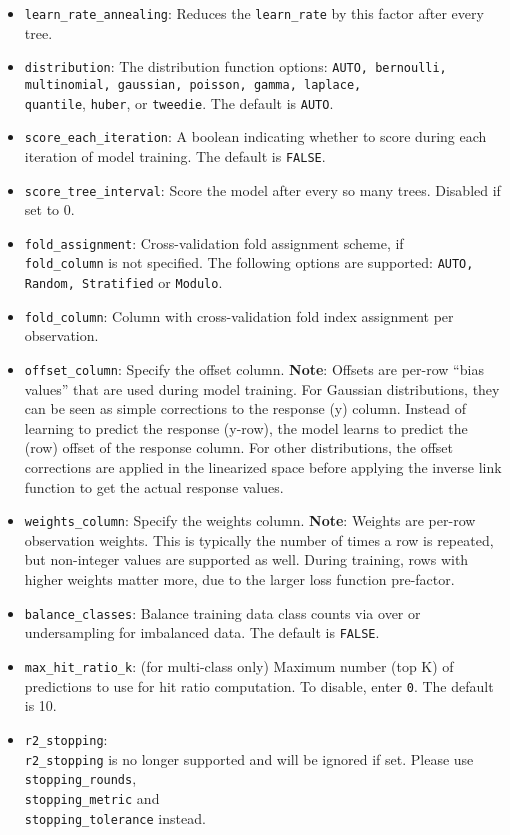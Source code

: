 \begin{itemize}
\item {\texttt{learn\_rate\_annealing}}: Reduces the {\texttt{learn\_rate}} by this factor after every tree. 
\item {\texttt{distribution}}: The distribution function options: \texttt{AUTO, bernoulli, multinomial, gaussian, poisson, gamma, laplace,} \\\texttt{quantile}, \texttt{huber}, or {\texttt{tweedie}}. The default is {\texttt{AUTO}}.
\item {\texttt{score\_each\_iteration}}: A boolean indicating whether to score during each iteration of model training.  The default is  {\texttt{FALSE}}.
\item {\texttt{score\_tree\_interval}}: Score the model after every so many trees. Disabled if set to 0.
\item \texttt{fold\_assignment}: Cross-validation fold assignment scheme, if  \\ \texttt{fold\_column} is not specified. The following options are supported: \texttt{AUTO, Random, Stratified} or \texttt{Modulo}. 
\item \texttt{fold\_column}:  Column with cross-validation fold index assignment per observation. 
\item \texttt{offset\_column}: Specify the offset column. {\textbf{Note}}: Offsets are per-row “bias values” that are used during model training. For Gaussian distributions, they can be seen as simple corrections to the response (y) column. Instead of learning to predict the response (y-row), the model learns to predict the (row) offset of the response column. For other distributions, the offset corrections are applied in the linearized space before applying the inverse link function to get the actual response values. 
\item \texttt{weights\_column}: Specify the weights column. {\textbf{Note}}: Weights are per-row observation weights. This is typically the number of times a row is repeated, but non-integer values are supported as well. During training, rows with higher weights matter more, due to the larger loss function pre-factor.
\item {\texttt{balance\_classes}}: Balance training data class counts via over or undersampling for imbalanced data. The default is {\texttt{FALSE}}.
\item {\texttt{max\_hit\_ratio\_k}}: (for multi-class only) Maximum number (top K) of predictions to use for hit ratio computation.  To disable, enter  {\texttt{0}}. The default is 10.
\item {\texttt{r2\_stopping}}: \\\texttt{r2\_stopping} is no longer supported and will be ignored if set. Please use \\\texttt{stopping\_rounds}, \\\texttt{stopping\_metric} and \\\texttt{stopping\_tolerance} instead.

\end{itemize}
